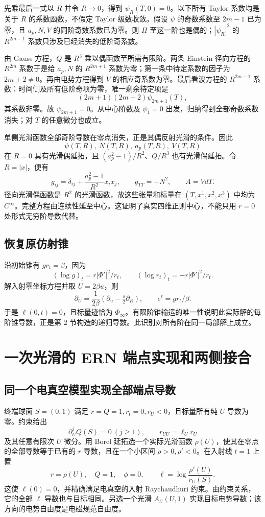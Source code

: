 先乘最后一式以 $R$ 并令 $R\to0$，得到 $\psi_R(T,0)=0$。以下所有 Taylor 系数均是关于 $R$ 的系数函数，不假定 Taylor 级数收敛。假设 $\psi$ 的奇数系数至 $2m-1$ 已为零，且 $a_p,N,V$ 的同阶奇数系数已为零。则 $\Pi$ 至这一阶也是偶的；$|\psi_R|^2$ 的 $R^{2m-1}$ 系数只涉及已经消失的低阶奇系数。

由 Gauss 方程，$Q$ 是 $R^3$ 乘以偶函数至所需有限阶。两条 Einstein 径向方程的 $R^{2m}$ 系数于是给 $a_p,N$ 的 $R^{2m+1}$ 系数为零；第一条中待定系数的因子为 $2m+2\ne0$。再由电势方程得到 $V$ 的相应奇系数为零。最后看波方程的 $R^{2m-1}$ 系数：时间侧及所有低阶奇项为零，唯一剩余待定项是
\[
(2m+1)(2m+2)\psi_{2m+1}(T),
\]
其系数非零。故 $\psi_{2m+1}=0$。从中心阶数及 $\psi_1=0$ 出发，归纳得到全部奇数系数消失；对 $T$ 的任意微分也成立。

单侧光滑函数全部奇阶导数在零点消失，正是其偶反射光滑的条件。因此
\[
\psi(T,R),\ N(T,R),\ a_p(T,R),\ V(T,R)
\]
在 $R=0$ 具有光滑偶延拓，且 $(a_p^2-1)/R^2$、$Q/R^3$ 也有光滑偶延拓。令 $R=|x|$，便有
\begin{equation}\label{eq:cartesian}
g_{ij}=\delta_{ij}+\frac{a_p^2-1}{R^2}x_ix_j,\qquad
g_{TT}=-N^2,\qquad A=VdT.
\end{equation}
径向光滑偶函数是 $R^2$ 的光滑函数，故这些张量和标量在 $(T,x^1,x^2,x^3)$ 中均为 $C^\infty$。完整方程由连续性延至中心。这证明了真实四维正则中心，不能只用 $r=0$ 处形式无穷阶导数代替。

\subsection{恢复原仿射锥}
沿初始锥有 $g r_t=\beta$，因为
\[
(\log g)_t=r|\Phi'|^2/r_t,\qquad
(\log r_t)_t=-r|\Phi'|^2/r_t.
\]
解入射零坐标方程并取 $U=2\beta u$，则
\[
\partial_U=\frac1{2\beta}(\partial_u-\tfrac s2\partial_R),
\qquad e^\ell=g r_t/\beta.
\]
于是 $\ell(0,t)=0$，且标量迹恰为 $\Phi_\infty$。有限阶锥输运的唯一性说明此实际解的每阶锥导数，正是第 2 节构造的递归导数。此识别对所有阶在同一局部解上成立。

\section{一次光滑的 ERN 端点实现和两侧接合}

\subsection{同一个电真空模型实现全部端点导数}
终端球面 $S=(0,1)$ 满足 $r=Q=1,r_t=0,r_U<0$，且标量所有纯 $U$ 导数为零。约束给出
\[
\partial_U^jQ(S)=0\ (j\ge1),\qquad
r_{UU}=\ell_Ur_U
\]
及其任意有限次 $U$ 微分。用 Borel 延拓选一个实际光滑函数 $\rho(U)$，使其在零点的全部导数等于已有的 $r$ 导数，且在一个小区间 $\rho>0,\rho'<0$。在入射线 $t=1$ 上置
\[
r=\rho(U),\quad Q=1,\quad\phi=0,\qquad
\ell=\log\frac{\rho'(U)}{r_U(S)}.
\]
这使 $\ell(0)=0$，并精确满足电真空的入射 Raychaudhuri 约束。由约束关系，它的全部 $\ell$ 导数也与目标相同。另选一个光滑 $A_U(U,1)$ 实现目标电势导数；该方向的电势自由度是电磁规范自由度。

